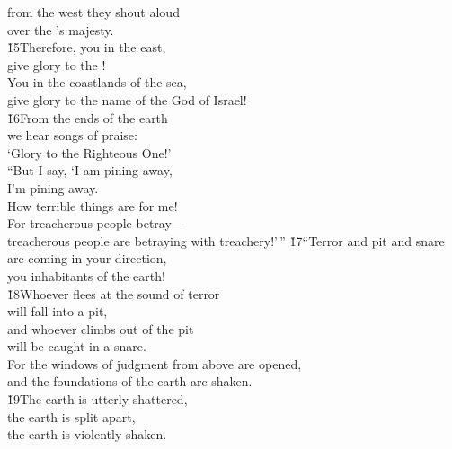 \begin{poetry}
\poeml from the west they shout aloud \\
\poemll    over the 's majesty. \\
\poeml \v{15}Therefore, you in the east, \\
\poemll    give glory to the ! \\
\poeml You in the coastlands of the sea, \\
\poemll    give glory to the name of the  God of Israel! \\
\poeml \v{16}From the ends of the earth \\
\poemll    we hear songs of praise: \\
\poemlll       `Glory to the Righteous One!' \\
\poeml ``But I say, `I am pining away, \\
\poemll    I'm pining away. \\
\poemlll       How terrible things are for me! \\
\poeml For treacherous people betray--- \\
\poemll    treacherous people are betraying with treachery!'\,''
\poeml \v{17}``Terror and pit and snare are coming in your direction, \\
\poemll    you inhabitants of the earth! \\
\poeml \v{18}Whoever flees at the sound of terror \\
\poemll    will fall into a pit, \\
\poeml and whoever climbs out of the pit \\
\poemll    will be caught in a snare. \\
\poeml For the windows of judgment from above are opened, \\
\poemll    and the foundations of the earth are shaken. \\
\poeml \v{19}The earth is utterly shattered, \\
\poemll    the earth is split apart, \\
\poemlll       the earth is violently shaken. \\

\end{poetry}
